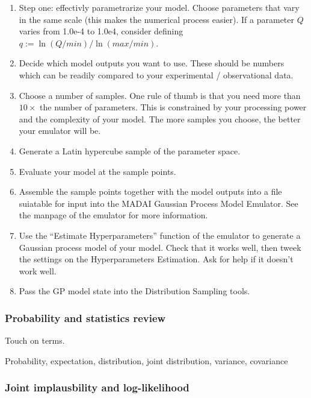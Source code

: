\documentclass{article}
\begin{document}
\begin{enumerate}

\item Step one: effectivly parametrarize your model. Choose parameters
  that vary in the same scale (this makes the numerical process
  easier). If a parameter $Q$ varies from 1.0e-4 to 1.0e4, consider
  defining $q := \ln(Q/min)/\ln(max/min)$.

\item Decide which model outputs you want to use. These should be
  numbers which can be readily compared to your experimental /
  observational data.

\item Choose a number of samples. One rule of thumb is that you need
  more than $10×$ the number of parameters. This is constrained by
  your processing power and the complexity of your model.  The more
  samples you choose, the better your emulator will be.

\item Generate a Latin hypercube sample of the parameter space. 

\item Evaluate your model at the sample points.

\item Assemble the sample points together with the model outputs into
  a file suiatable for input into the MADAI Gaussian Process Model
  Emulator.  See the manpage of the emulator for more information.

\item Use the “Estimate Hyperparameters” function of the emulator to
  generate a Gaussian process model of your model. Check that it works
  well, then tweek the settings on the Hyperparameters Estimation. Ask
  for help if it doesn’t work well.

\item Pass the GP model state into the Distribution Sampling tools.

\end{enumerate}

\subsubsection{Probability and statistics review}

Touch on terms.

Probability, expectation, distribution, joint distribution, variance,
covariance

\subsubsection{Joint implausbility and log-likelihood}
\end{document}
